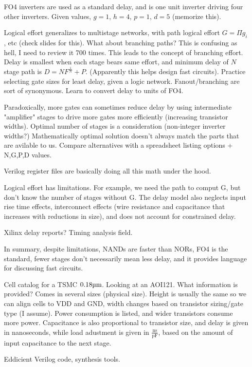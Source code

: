 \documentclass{article}
\begin{document}
FO4 inverters are used as a standard delay, and is one unit inverter driving four other inverters. Given values, \(g=1\), \(h=4\), \(p=1\), \(d=5\) (memorize this). 

Logical effort generalizes to multistage networks, with path logical effort \(G = \Pi g_i\), etc (check slides for this). What about branching paths? This is confusing as hell, I need to review it 700 times. This leads to the concept of branching effort. Delay is smallest when each stage bears same effort, and minimum delay of \(N\) stage path is \(D = NF^{\frac{1}{N}} + P\). (Apparently this helps design fast circuits). Practice selecting gate sizes for least delay, given a logic network. Fanout/branching are sort of synonymous. Learn to convert delay to units of FO4.

Paradoxically, more gates can sometimes reduce delay by using intermediate "amplifier" stages to drive more gates more efficiently (increasing transistor widths). Optimal number of stages is a consideration (non-integer inverter widths?) Mathematically optimal solution doesn't always match the parts that are avilable to us. Compare alternatives with a spreadsheet listing options + N,G,P,D values.

Verilog register files are basically doing all this math under the hood.

Logical effort has limitations. For example, we need the path to comput G, but don't know the number of stages without G. The delay model also neglects input rise time effects, interconnect effects (wire resistance and capacitance that increases with reductions in size), and does not account for constrained delay. 

Xilinx delay reports? Timing analysis field.

In summary, despite limitations, NANDs are faster than NORs, FO4 is the standard, fewer stages don't necessarily mean less delay, and it provides language for discussing fast circuits. 

Cell catalog for a TSMC \(0.18\micro\mathrm{m}\). Looking at an AOI121. What information is provided? Comes in several sizes (physical size). Height is usually the same so we can align cells to VDD and GND, width changes based on transistor sizing/gate type (I assume). Power consumption is listed, and wider transistors consume more power. Capacitance is also proportional to transistor size, and delay is given in nanoseconds, while load adustment is given in \(\frac{\mathrm{ns}}{\mathrm{pF}}\), based on the amount of input capacitance to the next stage.

Eddicient Verilog code, synthesis tools.
\end{document}
